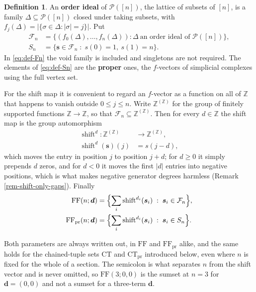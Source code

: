 \documentclass[11pt, a4paper, abstract=yes]{scrartcl}
\theoremstyle{definition}
\newtheorem{definition}{Definition}
\theoremstyle{remark}
\theoremstyle{plain}
\newcommand{\vek}[1]{\boldsymbol{#1}}
\newcommand{\shift}{\operatorname{shift}}
\begin{document}
\begin{definition}
An \textbf{order ideal} of \(\mathcal P([n])\), the lattice of subsets of \([n]\), is a family
\(\Delta\subseteq\mathcal P([n])\) closed under taking subsets, with
\(f_j(\Delta)=|\lbrace\sigma\in\Delta:|\sigma|=j\rbrace|\). Put
\begin{align}
  \mathcal F_n &=\lbrace(f_0(\Delta),\dots,f_n(\Delta)):\Delta\ \text{an order ideal of }\mathcal P([n])\rbrace,
    \label{eq:def-Fn}\\
  S_n &=\lbrace \vek s\in\mathcal F_n\;:\;s(0)=1,\ s(1)=n\rbrace .
    \label{eq:def-Sn}
\end{align}
In \eqref{eq:def-Fn} the void family is included and singletons are not required. The elements of
\eqref{eq:def-Sn} are the \textbf{proper} ones, the \(f\)-vectors of simplicial complexes using the full
vertex set.

For the shift map it is convenient to regard an \(f\)-vector as a function on all of \(\mathbb Z\)
that happens to vanish outside \(0\le j\le n\). Write \(\mathbb Z^{(\mathbb Z)}\) for the group of
finitely supported functions \(\mathbb Z\to\mathbb Z\), so that
\(\mathcal F_n\subseteq\mathbb Z^{(\mathbb Z)}\). Then for every \(d\in\mathbb Z\) the shift map
is the group automorphism
\begin{equation}\label{eq:def-shift}
\begin{split}
  \shift^d\colon\mathbb Z^{(\mathbb Z)} &\longrightarrow \mathbb Z^{(\mathbb Z)},\\
  \shift^d(\vek s)(j) &= s(j-d),
\end{split}
\end{equation}
which moves the entry in position \(j\) to position \(j+d\); for \(d\ge0\) it simply prepends
\(d\) zeros, and for \(d<0\) it moves the first \(\lvert d\rvert\) entries into negative
positions, which is what makes negative generator degrees harmless
(Remark \ref{rem-shift-only-gaps}). Finally
\begin{align}
  \mathrm{FF}(n;\vek d)&=\Bigl\lbrace\sum_i\shift^{d_i}(\vek s_i)\;:\;\vek s_i\in\mathcal F_n\Bigr\rbrace,
    \label{eq:def-FF}\\
  \mathrm{FF}_{\mathrm{pr}}(n;\vek d)&=\Bigl\lbrace\sum_i\shift^{d_i}(\vek s_i)\;:\;\vek s_i\in S_n\Bigr\rbrace .
    \label{eq:def-FFpr}
\end{align}

Both parameters are always written out, in \(\mathrm{FF}\) and \(\mathrm{FF}_{\mathrm{pr}}\)
alike, and the same holds for the chained-tuple sets \(\mathrm{CT}\) and
\(\mathrm{CT}_{\mathrm{pr}}\) introduced below, even where \(n\) is fixed for the whole of a
section. The semicolon is what separates \(n\) from the shift vector and is never omitted, so
\(\mathrm{FF}(3;0,0)\) is the sumset at \(n=3\) for \(\vek d=(0,0)\) and not a sumset for a
three-term \(\vek d\).
\label{def-fn}
\end{definition}
\end{document}
